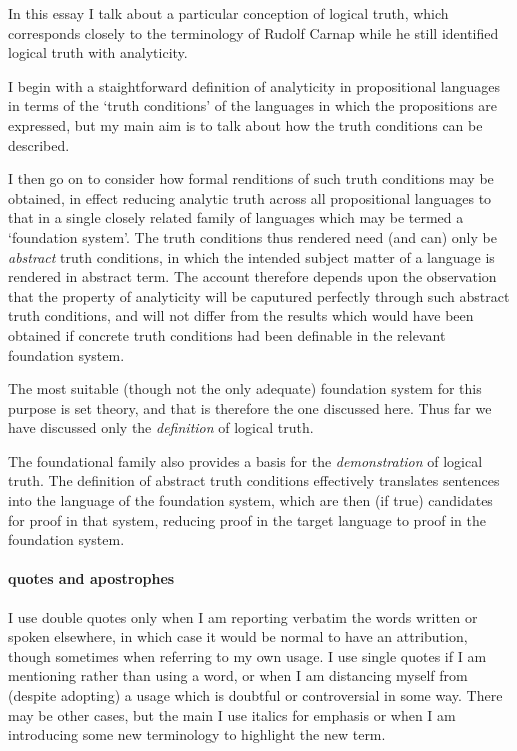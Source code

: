 \documentclass[10pt,titlepage]{article}
\begin{document}
In this essay I talk about a particular conception of logical truth, which corresponds closely to the terminology of Rudolf Carnap while he still identified logical truth with analyticity.

I begin with a staightforward definition of analyticity in propositional languages in terms of the `truth conditions' of the languages in which the propositions are expressed, but my main aim is to talk about how the truth conditions can be described.

I then go on to consider how formal renditions of such truth conditions may be obtained, in effect reducing analytic truth across all propositional languages to that in a single closely related family of languages which may be termed a `foundation system'.
The truth conditions thus rendered need (and can) only be \emph{abstract} truth conditions, in which the intended subject matter of a language is rendered in abstract term.
The account therefore depends upon the observation that the property of analyticity will be caputured perfectly through such abstract truth conditions, and will not differ from the results which would have been obtained if concrete truth conditions had been definable in the relevant foundation system.

The most suitable (though not the only adequate) foundation system for this purpose is set theory, and that is therefore the one discussed here.
Thus far we have discussed only the \emph{definition} of logical truth.

The foundational family also provides a basis for the \emph{demonstration} of logical truth.
The definition of abstract truth conditions effectively translates sentences into the language of the foundation system, which are then (if true) candidates for proof in that system, reducing proof in the target language to proof in the foundation system.

\paragraph{quotes and apostrophes}

I use double quotes only when I am reporting verbatim the words written or spoken elsewhere, in which case it would be normal to have an attribution, though sometimes when referring to my own usage.
I use single quotes if I am mentioning rather than using a word, or when I am distancing myself from (despite adopting) a usage which is doubtful or controversial in some way.
There may be other cases, but the main
I use italics for emphasis or when I am introducing some new terminology to highlight the new term.
\end{document}

